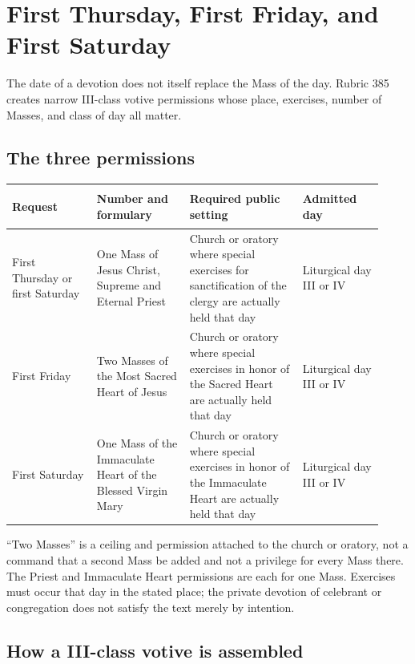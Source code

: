 \section{First Thursday, First Friday, and First Saturday}

The date of a devotion does not itself replace the Mass of the day. Rubric 385 creates narrow III-class votive permissions whose place, exercises, number of Masses, and class of day all matter.

\subsection{The three permissions}

\begin{longtable}{>{\bfseries\raggedright\arraybackslash}p{0.21\linewidth}>{\raggedright\arraybackslash}p{0.23\linewidth}>{\raggedright\arraybackslash}p{0.28\linewidth}>{\raggedright\arraybackslash}p{0.20\linewidth}}
\toprule
Request & Number and formulary & Required public setting & Admitted day\\
\midrule
\endhead
First Thursday or first Saturday & One Mass of Jesus Christ, Supreme and Eternal Priest & Church or oratory where special exercises for sanctification of the clergy are actually held that day & Liturgical day III or IV\\
First Friday & Two Masses of the Most Sacred Heart of Jesus & Church or oratory where special exercises in honor of the Sacred Heart are actually held that day & Liturgical day III or IV\\
First Saturday & One Mass of the Immaculate Heart of the Blessed Virgin Mary & Church or oratory where special exercises in honor of the Immaculate Heart are actually held that day & Liturgical day III or IV\\
\bottomrule
\end{longtable}

“Two Masses” is a ceiling and permission attached to the church or oratory, not a command that a second Mass be added and not a privilege for every Mass there. The Priest and Immaculate Heart permissions are each for one Mass. Exercises must occur that day in the stated place; the private devotion of celebrant or congregation does not satisfy the text merely by intention.

\subsection{How a III-class votive is assembled}

